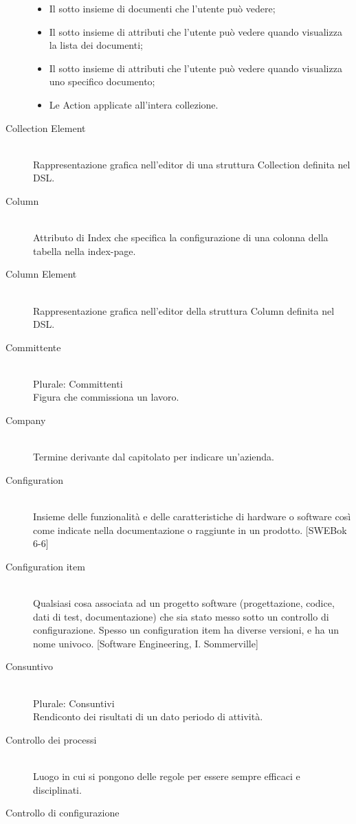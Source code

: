 \begin{description}
\begin{itemize}
\item Il sotto insieme di documenti che l'utente può vedere;
\item Il sotto insieme di attributi che l'utente può vedere quando visualizza la lista dei documenti;
\item Il sotto insieme di attributi che l'utente può vedere quando visualizza uno specifico documento;
\item Le Action applicate all'intera collezione.
\end{itemize}
 \item[Collection Element] \hfill \\
Rappresentazione grafica nell'editor di una struttura Collection definita nel DSL.
 \item[Column] \hfill \\
Attributo di Index che specifica la configurazione di una colonna della tabella nella index-page.
 \item[Column Element] \hfill \\
Rappresentazione grafica nell'editor della struttura Column definita nel DSL.
 \item[Committente] \hfill \\
Plurale: Committenti\\ 
Figura che commissiona un lavoro.
 \item[Company] \hfill \\
Termine derivante dal capitolato per indicare un'azienda.
 \item[Configuration] \hfill \\
Insieme delle funzionalità e delle caratteristiche di
		hardware o software così come indicate nella documentazione o raggiunte in un prodotto. [SWEBok 6-6]
 \item[Configuration item] \hfill \\
Qualsiasi cosa associata ad un progetto software
		(progettazione, codice, dati di test, documentazione) che sia stato	messo sotto un controllo di configurazione. Spesso un configuration item ha diverse versioni, e ha un nome univoco. [Software Engineering, I. Sommerville]
 \item[Consuntivo] \hfill \\
Plurale: Consuntivi\\ 
Rendiconto  dei risultati di un dato periodo di attività.
 \item[Controllo dei processi] \hfill \\
Luogo in cui si pongono delle regole per essere sempre efficaci e disciplinati.
 \item[Controllo di configurazione] \hfill \\

\end{description}
